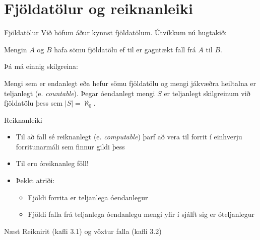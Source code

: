 \documentclass{beamer}
\begin{document}
\section{Fjöldatölur og reiknanleiki}

\begin{frame}{Fjöldatölur}
Við höfum áður kynnst fjöldatölum. Útvíkkum nú hugtakið:

\begin{tcolorbox}[title=Eins fjöldatölur]
Mengin $A$ og $B$ hafa sömu fjöldatölu ef til er gagntækt fall frá $A$ til $B$.
\end{tcolorbox}

Þá má einnig skilgreina:

\begin{tcolorbox}[title=Teljanleiki]
Mengi sem er endanlegt eða hefur sömu fjöldatölu og mengi jákvæðra heiltalna er teljanlegt (e. \emph{countable}). Þegar óendanlegt mengi $S$ er teljanlegt skilgreinum við fjöldatölu þess sem $|S| = \aleph_0$.
\end{tcolorbox}
\end{frame}

\begin{frame}{Reiknanleiki}
\begin{itemize}
 \item Til að fall sé reiknanlegt (e. \emph{computable}) þarf að vera til forrit í einhverju forritunarmáli sem finnur gildi þess
 \item Til eru óreiknanleg föll!
 \item Þekkt atriði:
 \begin{itemize}
  \item Fjöldi forrita er teljanlega óendanlegur
  \item Fjöldi falla frá teljanlega óendanlegu mengi yfir í sjálft sig er óteljanlegur
 \end{itemize}
\end{itemize}
\end{frame}

\begin{frame}{Næst}
Reiknirit (kafli 3.1) og vöxtur falla (kafli 3.2)
\end{frame}
\end{document}
